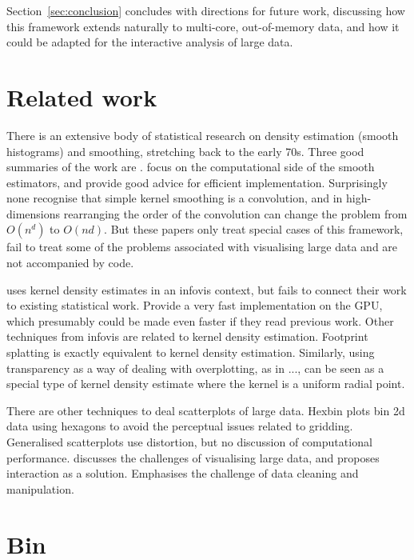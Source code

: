 \documentclass[journal]{vgtc}                %
\begin{document}
Section~\ref{sec:conclusion} concludes with directions for future work, discussing how this framework extends naturally to multi-core, out-of-memory data, and how it could be adapted for the interactive analysis of large data.

\section{Related work}
\label{sec:related-work}

There is an extensive body of statistical research on density estimation (smooth histograms) and smoothing, stretching back to the early 70s. Three good summaries of the work are \cite{scott:1992,bowman:1997,loader:1999a}.    \cite{hardle:1992,wand:1994,fan:1994} focus on the computational side of the smooth estimators, and provide good advice for efficient implementation.  Surprisingly none recognise that simple kernel smoothing is a convolution, and in high-dimensions rearranging the order of the convolution can change the problem from $O(n^d)$ to $O(nd)$. But these papers only treat special cases of this framework, fail to treat some of the problems associated with visualising large data and are not accompanied by code.

\citep{lampe:2011} uses kernel density estimates in an infovis context, but fails to connect their work to existing statistical work. Provide a very fast implementation on the GPU, which presumably could be made even faster if they read previous work. Other techniques from infovis are related to kernel density estimation. Footprint splatting \citep{becker:1997,yang:2003} is exactly equivalent to kernel density estimation. Similarly, using transparency as a way of dealing with overplotting, as in ..., can be seen as a special type of kernel density estimate where the kernel is a uniform radial point.

There are other techniques to deal scatterplots of large data. Hexbin plots \citep{carr:1987} bin 2d data using hexagons to avoid the perceptual issues related to gridding. Generalised scatterplots \citep{keim:2010} use distortion, but no discussion of computational performance. \citep{heer:2012} discusses the challenges of visualising large data, and proposes interaction as a solution. Emphasises the challenge of data cleaning and manipulation.

\section{Bin}
\label{sec:bin}
\end{document}

